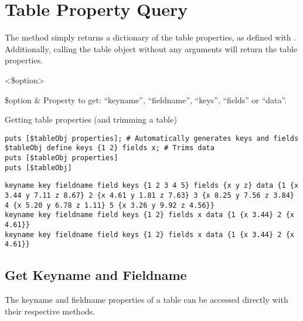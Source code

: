 \documentclass{article}
\begin{document}
\section{Table Property Query}
The method  simply returns a dictionary of the table properties, as defined with .
Additionally, calling the table object without any arguments will return the table properties.
\begin{syntax}
 <\$option>
\end{syntax}
\begin{args}
\$option & Property to get: ``keyname'', ``fieldname'', ``keys'', ``fields'' or ``data''. 
\end{args}
\begin{example}{Getting table properties (and trimming a table)}
\begin{lstlisting}
puts [$tableObj properties]; # Automatically generates keys and fields
$tableObj define keys {1 2} fields x; # Trims data
puts [$tableObj properties]
puts [$tableObj]
\end{lstlisting}
\tcblower
\begin{lstlisting}
keyname key fieldname field keys {1 2 3 4 5} fields {x y z} data {1 {x 3.44 y 7.11 z 8.67} 2 {x 4.61 y 1.81 z 7.63} 3 {x 8.25 y 7.56 z 3.84} 4 {x 5.20 y 6.78 z 1.11} 5 {x 3.26 y 9.92 z 4.56}}
keyname key fieldname field keys {1 2} fields x data {1 {x 3.44} 2 {x 4.61}}
keyname key fieldname field keys {1 2} fields x data {1 {x 3.44} 2 {x 4.61}}
\end{lstlisting}
\end{example}

\subsection{Get Keyname and Fieldname}
The keyname and fieldname properties of a table can be accessed directly with their respective methods. 
\begin{syntax}
\end{syntax}
\begin{syntax}
\end{syntax}

\clearpage
\end{document}
